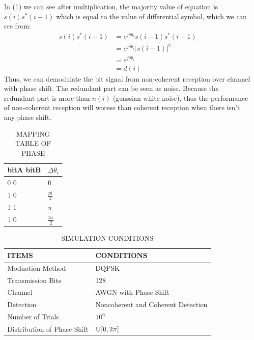 \documentclass[technicalreport]{ieicej}
\begin{document}
In (1) we can see after multiplication, the majority value of equation is $s(i)s^*(i-1)$ which is equal to the value of differential symbol, which we can see from:
\begin{equation}
\begin{aligned}
s(i)s^*(i-1)&=e^{j\delta\theta_i}s(i-1)s^*(i-1)\\
&=e^{j\delta\theta_i}|s(i-1)|^2\\
&=e^{j\delta\theta_i}\\
&=d(i)
\end{aligned}
\end{equation}
Thus, we can demodulate the bit signal from non-coherent reception over channel with phase shift. The redundant part can be seen as noise. Because the redundant part is more than $n(i)$ (guassian white noise), thus the performance of non-coherent reception will worese than coherent reception when there isn't any phase shift.

\begin{table}[tbp]
	\begin{center}
	\caption{MAPPING TABLE OF PHASE}
	\begin{tabular}{ll}
	\hline
	\textbf{bitA bitB} & \textbf{$\Delta\theta_{i}$} \\
	\hline
	0 0 & $0$ \\
	1 0 & $\frac{pi}{2}$ \\
	1 1 & $\pi$ \\
	1 0 & $\frac{3\pi}{2}$ \\
	\hline
	\end{tabular}
	\end{center}
\end{table}

\begin{table}[hb]
	\begin{center}
	\caption{SIMULATION CONDITIONS}
	\label{tbl:simu}
	\small
	\begin{tabular}{ll}
	\hline
	ITEMS & CONDITIONS\\
	\hline
	Moduation Method & DQPSK \\
	Transmission Bits & 128 \\
	Channel & AWGN with Phase Shift \\
	Detection & Noncoherent and Coherent Detection \\
	Number of Trials & $10^{6}$\\
	Distribution of Phase Shift & ${\rm U}[0,2\pi]$\\
	\hline
	\end{tabular}
	\end{center}
\end{table}
\end{document}
